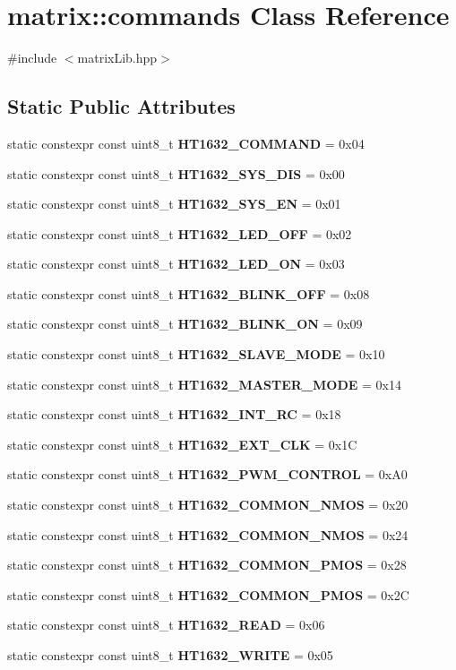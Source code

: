 \hypertarget{structmatrix_1_1commands}{}\section{matrix\+:\+:commands Class Reference}
\label{structmatrix_1_1commands}


{\ttfamily \#include $<$matrix\+Lib.\+hpp$>$}

\subsection*{Static Public Attributes}
\begin{DoxyCompactItemize}
\item 
static constexpr const uint8\+\_\+t {\bfseries H\+T1632\+\_\+\+C\+O\+M\+M\+A\+ND} = 0x04
\item 
static constexpr const uint8\+\_\+t {\bfseries H\+T1632\+\_\+\+S\+Y\+S\+\_\+\+D\+IS} = 0x00
\item 
static constexpr const uint8\+\_\+t {\bfseries H\+T1632\+\_\+\+S\+Y\+S\+\_\+\+EN} = 0x01
\item 
static constexpr const uint8\+\_\+t {\bfseries H\+T1632\+\_\+\+L\+E\+D\+\_\+\+O\+FF} = 0x02
\item 
static constexpr const uint8\+\_\+t {\bfseries H\+T1632\+\_\+\+L\+E\+D\+\_\+\+ON} = 0x03
\item 
static constexpr const uint8\+\_\+t {\bfseries H\+T1632\+\_\+\+B\+L\+I\+N\+K\+\_\+\+O\+FF} = 0x08
\item 
static constexpr const uint8\+\_\+t {\bfseries H\+T1632\+\_\+\+B\+L\+I\+N\+K\+\_\+\+ON} = 0x09
\item 
static constexpr const uint8\+\_\+t {\bfseries H\+T1632\+\_\+\+S\+L\+A\+V\+E\+\_\+\+M\+O\+DE} = 0x10
\item 
static constexpr const uint8\+\_\+t {\bfseries H\+T1632\+\_\+\+M\+A\+S\+T\+E\+R\+\_\+\+M\+O\+DE} = 0x14
\item 
static constexpr const uint8\+\_\+t {\bfseries H\+T1632\+\_\+\+I\+N\+T\+\_\+\+RC} = 0x18
\item 
static constexpr const uint8\+\_\+t {\bfseries H\+T1632\+\_\+\+E\+X\+T\+\_\+\+C\+LK} = 0x1C
\item 
static constexpr const uint8\+\_\+t {\bfseries H\+T1632\+\_\+\+P\+W\+M\+\_\+\+C\+O\+N\+T\+R\+OL} = 0x\+A0
\item 
static constexpr const uint8\+\_\+t {\bfseries H\+T1632\+\_\+\+C\+O\+M\+M\+O\+N\+\_\+N\+M\+OS} = 0x20
\item 
static constexpr const uint8\+\_\+t {\bfseries H\+T1632\+\_\+\+C\+O\+M\+M\+O\+N\+\_\+N\+M\+OS} = 0x24
\item 
static constexpr const uint8\+\_\+t {\bfseries H\+T1632\+\_\+\+C\+O\+M\+M\+O\+N\+\_\+P\+M\+OS} = 0x28
\item 
static constexpr const uint8\+\_\+t {\bfseries H\+T1632\+\_\+\+C\+O\+M\+M\+O\+N\+\_\+P\+M\+OS} = 0x2C
\item 
static constexpr const uint8\+\_\+t {\bfseries H\+T1632\+\_\+\+R\+E\+AD} = 0x06
\item 
static constexpr const uint8\+\_\+t {\bfseries H\+T1632\+\_\+\+W\+R\+I\+TE} = 0x05
\end{DoxyCompactItemize}



